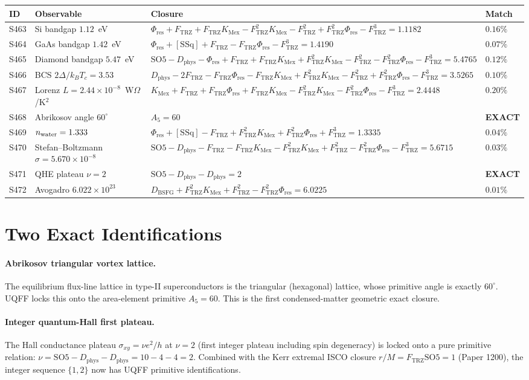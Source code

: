 \documentclass[11pt]{article}
\newcommand{\Ftrz}{F_{\mathrm{TRZ}}}
\newcommand{\Phires}{\Phi_{\mathrm{res}}}
\newcommand{\KMex}{K_{\mathrm{Mex}}}
\newcommand{\Dphys}{D_{\mathrm{phys}}}
\newcommand{\Dbsfg}{D_{\mathrm{BSFG}}}
\newcommand{\SOfive}{\mathrm{SO5}}
\newcommand{\Afive}{A_{5}}
\newcommand{\SSq}{[\mathrm{SSq}]}
\begin{document}
\begin{longtable}{@{}llll@{}}
\toprule
ID & Observable & Closure & Match \\
\midrule
\endhead
S463 & Si bandgap $1.12$~eV & $\Phires+\Ftrz+\Ftrz\KMex-\Ftrz^2\KMex-\Ftrz^2+\Ftrz^2\Phires-\Ftrz^3=1.1182$ & $0.16\%$ \\
S464 & GaAs bandgap $1.42$~eV & $\Phires+\SSq+\Ftrz-\Ftrz\Phires-\Ftrz^3=1.4190$ & $0.07\%$ \\
S465 & Diamond bandgap $5.47$~eV & $\SOfive-\Dphys-\Phires+\Ftrz+\Ftrz\KMex+\Ftrz^2\KMex-\Ftrz^2-\Ftrz^2\Phires-\Ftrz^3=5.4765$ & $0.12\%$ \\
S466 & BCS $2\Delta/k_BT_c=3.53$ & $\Dphys-2\Ftrz-\Ftrz\Phires-\Ftrz\KMex+\Ftrz^2\KMex-\Ftrz^2+\Ftrz^2\Phires-\Ftrz^3=3.5265$ & $0.10\%$ \\
S467 & Lorenz $L=2.44\times10^{-8}$~W$\Omega$/K$^2$ & $\KMex+\Ftrz+\Ftrz\Phires+\Ftrz\KMex-\Ftrz^2\KMex-\Ftrz^2\Phires-\Ftrz^3=2.4448$ & $0.20\%$ \\
S468 & Abrikosov angle $60^\circ$ & $\Afive=60$ & \textbf{EXACT} \\
S469 & $n_{\rm water}=1.333$ & $\Phires+\SSq-\Ftrz+\Ftrz^2\KMex+\Ftrz^2\Phires+\Ftrz^3=1.3335$ & $0.04\%$ \\
S470 & Stefan--Boltzmann $\sigma=5.670\times10^{-8}$ & $\SOfive-\Dphys-\Ftrz-\Ftrz\KMex-\Ftrz^2\KMex+\Ftrz^2-\Ftrz^2\Phires-\Ftrz^3=5.6715$ & $0.03\%$ \\
S471 & QHE plateau $\nu=2$ & $\SOfive-\Dphys-\Dphys=2$ & \textbf{EXACT} \\
S472 & Avogadro $6.022\times10^{23}$ & $\Dbsfg+\Ftrz^2\KMex+\Ftrz^2-\Ftrz^2\Phires=6.0225$ & $0.01\%$ \\
\bottomrule
\end{longtable}

\section{Two Exact Identifications}

\paragraph{Abrikosov triangular vortex lattice.}
The equilibrium flux-line lattice in type-II superconductors is the triangular
(hexagonal) lattice, whose primitive angle is exactly $60^\circ$. UQFF locks
this onto the area-element primitive $\Afive = 60$. This is the first
condensed-matter geometric exact closure.

\paragraph{Integer quantum-Hall first plateau.}
The Hall conductance plateau $\sigma_{xy} = \nu e^2/h$ at $\nu = 2$ (first
integer plateau including spin degeneracy) is locked onto a pure primitive
relation: $\nu = \SOfive - \Dphys - \Dphys = 10 - 4 - 4 = 2$. Combined with
the Kerr extremal ISCO closure $r/M = \Ftrz\SOfive = 1$ (Paper 1200), the
integer sequence $\{1, 2\}$ now has UQFF primitive identifications.
\end{document}
